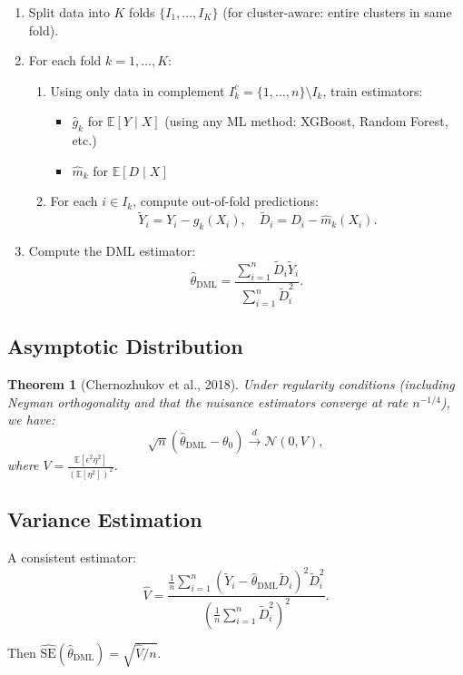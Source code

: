\documentclass[12pt]{article}
\numberwithin{equation}{section}
\newtheorem{theorem}{Theorem}[section]
\begin{document}
	\begin{enumerate}
		\item Split data into $K$ folds $\{I_1, \dots, I_K\}$ (for cluster-aware: entire clusters in same fold).
		\item For each fold $k = 1, \dots, K$:
		\begin{enumerate}
			\item Using only data in complement $I_k^c = \{1,\dots,n\} \setminus I_k$, train estimators:
			\begin{itemize}
				\item $\hat{g}_k$ for $\mathbb{E}[Y \mid X]$ (using any ML method: XGBoost, Random Forest, etc.)
				\item $\hat{m}_k$ for $\mathbb{E}[D \mid X]$
			\end{itemize}
			\item For each $i \in I_k$, compute out-of-fold predictions:
			\[
			\tilde{Y}_i = Y_i - \hat{g}_k(X_i), \quad \tilde{D}_i = D_i - \hat{m}_k(X_i).
			\]
		\end{enumerate}
		\item Compute the DML estimator:
		\[
		\hat{\theta}_{\text{DML}} = \frac{\sum_{i=1}^n \tilde{D}_i \tilde{Y}_i}{\sum_{i=1}^n \tilde{D}_i^2}.
		\]
	\end{enumerate}
	
	\subsection{Asymptotic Distribution}
	
	\begin{theorem}[Chernozhukov et al., 2018]
		Under regularity conditions (including Neyman orthogonality and that the nuisance estimators converge at rate $n^{-1/4}$), we have:
		\[
		\sqrt{n} (\hat{\theta}_{\text{DML}} - \theta_0) \xrightarrow{d} \mathcal{N}(0, V),
		\]
		where $V = \frac{\mathbb{E}[\epsilon^2 \eta^2]}{(\mathbb{E}[\eta^2])^2}$.
	\end{theorem}
	
	\subsection{Variance Estimation}
	
	A consistent estimator:
	\[
	\hat{V} = \frac{\frac{1}{n} \sum_{i=1}^n (\tilde{Y}_i - \hat{\theta}_{\text{DML}} \tilde{D}_i)^2 \tilde{D}_i^2}{\left( \frac{1}{n} \sum_{i=1}^n \tilde{D}_i^2 \right)^2}.
	\]
	
	Then $\widehat{\text{SE}}(\hat{\theta}_{\text{DML}}) = \sqrt{\hat{V} / n}$.
	
\end{document}
